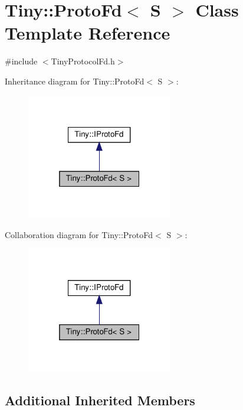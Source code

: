 \hypertarget{classTiny_1_1ProtoFd}{}\section{Tiny\+:\+:Proto\+Fd$<$ S $>$ Class Template Reference}
\label{classTiny_1_1ProtoFd}


{\ttfamily \#include $<$Tiny\+Protocol\+Fd.\+h$>$}



Inheritance diagram for Tiny\+:\+:Proto\+Fd$<$ S $>$\+:
\nopagebreak
\begin{figure}[H]
\begin{center}
\leavevmode
\includegraphics[width=181pt]{classTiny_1_1ProtoFd__inherit__graph}
\end{center}
\end{figure}


Collaboration diagram for Tiny\+:\+:Proto\+Fd$<$ S $>$\+:
\nopagebreak
\begin{figure}[H]
\begin{center}
\leavevmode
\includegraphics[width=181pt]{classTiny_1_1ProtoFd__coll__graph}
\end{center}
\end{figure}
\subsection*{Additional Inherited Members}


